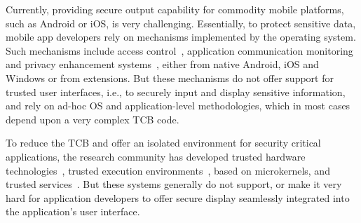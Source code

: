 
Currently, providing secure output capability for commodity mobile platforms, such as Android or iOS, is very challenging. Essentially, to protect sensitive data, mobile app developers rely on mechanisms implemented by the operating system. Such mechanisms include access control~\cite{smalley2013security,bugiel2011practical,nauman2010apex,kern2012permission,conti2011crepe,russello2012moses,heuser2014asm,backes2014android,wang2015deepdroid,drm}, application communication monitoring~\cite{ongtang2012semantically,dietz2011quire,bugiel2011xmandroid} and privacy enhancement systems~\cite{beresford2011mockdroid,zhou2011taming,shebaro2014identidroid,enck2014taintdroid}, either from native Android, iOS and Windows or from extensions. But these mechanisms do not offer support for trusted user interfaces, i.e., to securely input and display sensitive information, and rely on ad-hoc \ac{OS} and application-level methodologies, which in most cases depend upon a very complex \ac{TCB} code.

To reduce the \ac{TCB} and offer an isolated environment for security critical applications, the research community has developed trusted hardware technologies~\cite{trustzone_whitepaper}, trusted execution environments~\cite{genode,t6_tee,knox_whitepaper,fitzekandix,kostiainen2012board,mcgillion2015open,sun2015trustice,santos2011trusted,sierra_tee,tlk,op_tee}, based on microkernels, and trusted services~\cite{li2014droidvault,brasserregulating,li2014building,li2015adattester,sun2015trustotp,sun2015reliable,aks}. But these systems generally do not support, or make it very hard for application developers to offer secure display seamlessly integrated into the application's user interface.


